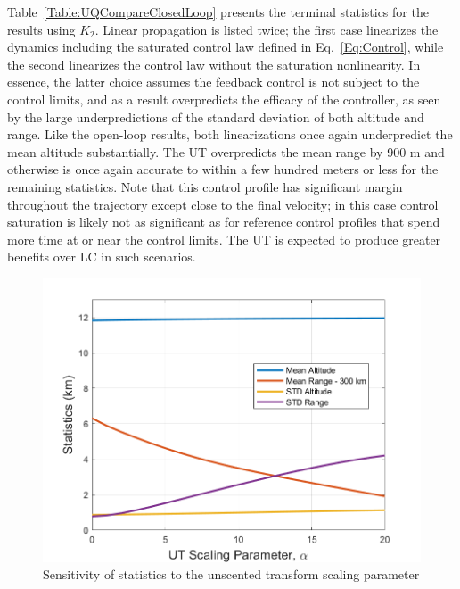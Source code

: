 Table~\ref{Table:UQCompareClosedLoop} presents the terminal statistics for the results using $K_2$. Linear propagation is listed twice; the first case linearizes the dynamics including the saturated control law defined in Eq.~\eqref{Eq:Control}, while the second linearizes the control law without the saturation nonlinearity. In essence, the latter choice assumes the feedback control is not subject to the control limits, and as a result overpredicts the efficacy of the controller, as seen by the large underpredictions of the standard deviation of both altitude and range. 
Like the open-loop results, both linearizations once again underpredict the mean altitude substantially. The UT overpredicts the mean range by 900 m and otherwise is once again accurate to within a few hundred meters or less for the remaining statistics. Note that this control profile has significant margin throughout the trajectory except close to the final velocity; in this case control saturation is likely not as significant as for reference control profiles that spend more time at or near the control limits. The UT is expected to produce greater benefits over LC in such scenarios.

\begin{figure}[h!]
	\centering
	\includegraphics[width=1\textwidth]{Images/AlphaSensitivity}
	\caption{Sensitivity of statistics to the unscented transform scaling parameter}
	\label{Fig:AlphaSensitivity}
\end{figure}

